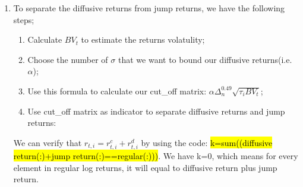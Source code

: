 \documentclass[12pt,letterpaper]{article}
\begin{document}
\begin{enumerate}[label=\textbf{(\Alph*)}]
\item To separate the diffusive returns from jump returns, we have the following steps;
   \begin{enumerate}[label=(\roman*)]
  	    \item Calculate $BV_t$ to estimate the returns volatulity;
  	    \item Choose the number of $\sigma$ that we want to bound our diffusive returns(i.e. $\alpha$);
  	    \item Use this formula to calculate our cut\_off matrix: $\alpha\Delta_n^0.49\sqrt{\tau_iBV_t}$;
  	    \item Use cut\_off matrix as indicator to separate diffusive returns and jump returns:
 	\end{enumerate} 
 	
We can verify that $r_{t,i}=r_{t,i}^c+r_{t,i}^d$ by using the code: \hl{k=sum((diffusive return(:)+jump return(:)==regular(:)))}. We have k=0, which means for every element in regular log returns, it will equal to diffusive return plus jump return.
 	

\end{enumerate}
\end{document}
